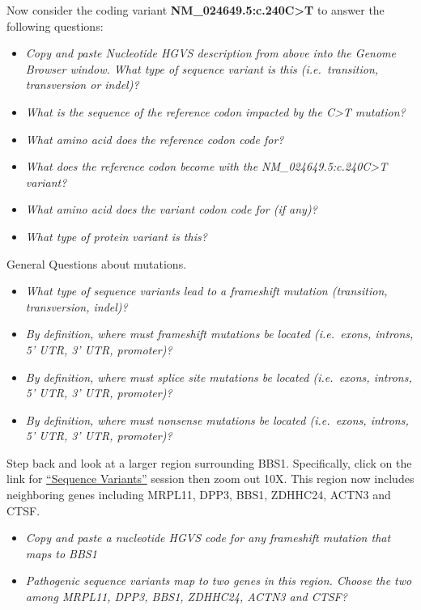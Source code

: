 \documentclass[
]{book}
\providecommand{\tightlist}{%
  \setlength{\itemsep}{0pt}\setlength{\parskip}{0pt}}
\begin{document}
Now consider the coding variant \textbf{NM\_024649.5:c.240C\textgreater T} to answer the following questions:

\begin{itemize}
\tightlist
\item
  \emph{Copy and paste Nucleotide HGVS description from above into the Genome Browser window. What type of sequence variant is this (i.e.~transition, transversion or indel)?}
\item
  \emph{What is the sequence of the reference codon impacted by the C\textgreater T mutation?}
\item
  \emph{What amino acid does the reference codon code for?}
\item
  \emph{What does the reference codon become with the NM\_024649.5:c.240C\textgreater T variant?}
\item
  \emph{What amino acid does the variant codon code for (if any)?}
\item
  \emph{What type of protein variant is this?}
\end{itemize}

General Questions about mutations.

\begin{itemize}
\tightlist
\item
  \emph{What type of sequence variants lead to a frameshift mutation (transition, transversion, indel)?}
\item
  \emph{By definition, where must frameshift mutations be located (i.e.~exons, introns, 5' UTR, 3' UTR, promoter)?}
\item
  \emph{By definition, where must splice site mutations be located (i.e.~exons, introns, 5' UTR, 3' UTR, promoter)?}
\item
  \emph{By definition, where must nonsense mutations be located (i.e.~exons, introns, 5' UTR, 3' UTR, promoter)?}
\end{itemize}

Step back and look at a larger region surrounding BBS1. Specifically, click on the link for \href{https://genome.ucsc.edu/s/megallegos/Biol\%20310\%3A\%20Module\%204\%3A\%20Mutational\%20Analysis}{``Sequence Variants''} session then zoom out 10X. This region now includes neighboring genes including MRPL11, DPP3, BBS1, ZDHHC24, ACTN3 and CTSF.

\begin{itemize}
\tightlist
\item
  \emph{Copy and paste a nucleotide HGVS code for any frameshift mutation that maps to BBS1}
\item
  \emph{Pathogenic sequence variants map to two genes in this region. Choose the two among MRPL11, DPP3, BBS1, ZDHHC24, ACTN3 and CTSF?}
\end{itemize}
\end{document}

